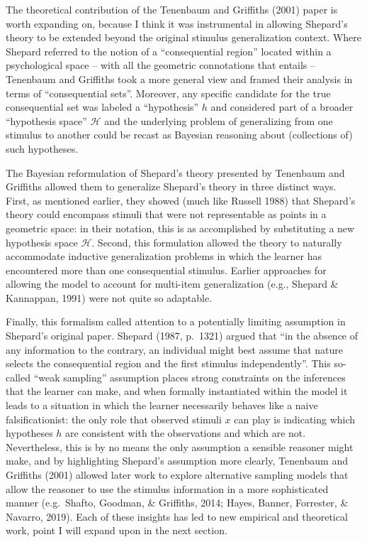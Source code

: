 \documentclass[
  english,
  doc]{apa6}
\begin{document}
The theoretical contribution of the Tenenbaum and Griffiths (2001) paper is worth expanding on, because I think it was instrumental in allowing Shepard's theory to be extended beyond the original stimulus generalization context. Where Shepard referred to the notion of a \enquote{consequential region} located within a psychological space -- with all the geometric connotations that entails -- Tenenbaum and Griffiths took a more general view and framed their analysis in terms of \enquote{consequential sets}. Moreover, any specific candidate for the true consequential set was labeled a \enquote{hypothesis} \(h\) and considered part of a broader \enquote{hypothesis space} \(\mathcal{H}\) and the underlying problem of generalizing from one stimulus to another could be recast as Bayesian reasoning about (collections of) such hypotheses.

The Bayesian reformulation of Shepard's theory presented by Tenenbaum and Griffiths allowed them to generalize Shepard's theory in three distinct ways. First, as mentioned earlier, they showed (much like Russell 1988) that Shepard's theory could encompass stimuli that were not representable as points in a geometric space: in their notation, this is as accomplished by substituting a new hypothesis space \(\mathcal{H}\). Second, this formulation allowed the theory to naturally accommodate inductive generalization problems in which the learner has encountered more than one consequential stimulus. Earlier approaches for allowing the model to account for multi-item generalization (e.g., Shepard \& Kannappan, 1991) were not quite so adaptable.

Finally, this formalism called attention to a potentially limiting assumption in Shepard's original paper. Shepard (1987, p.~1321) argued that \enquote{in the absence of any information to the contrary, an individual might best assume that nature selects the consequential region and the first stimulus independently}. This so-called \enquote{weak sampling} assumption places strong constraints on the inferences that the learner can make, and when formally instantiated within the model it leads to a situation in which the learner necessarily behaves like a naive falsificationist: the only role that observed stimuli \(x\) can play is indicating which hypotheses \(h\) are consistent with the observations and which are not. Nevertheless, this is by no means the only assumption a sensible reasoner might make, and by highlighting Shepard's assumption more clearly, Tenenbaum and Griffiths (2001) allowed later work to explore alternative sampling models that allow the reasoner to use the stimulus information in a more sophisticated manner (e.g.~Shafto, Goodman, \& Griffiths, 2014; Hayes, Banner, Forrester, \& Navarro, 2019). Each of these insights has led to new empirical and theoretical work, point I will expand upon in the next section.
\end{document}
